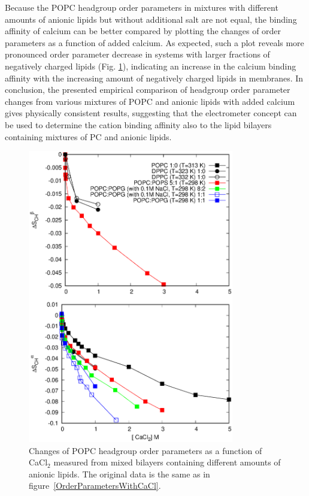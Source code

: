 \documentclass[journal=jpcbfk]{achemso}
\begin{document}
Because the POPC headgroup order parameters in mixtures with different amounts of anionic lipids
but without additional salt are not equal, the binding affinity of calcium can be better compared
by plotting the changes of order parameters as a function of added calcium.
As expected, such a plot reveals more pronounced order parameter decrease in systems
with larger fractions of negatively charged lipids (Fig. \ref{OrderParameterCHANGESWithCaClBELOW1M}),
indicating an increase in the calcium binding affinity with the increasing amount of negatively charged
lipids in membranes. In conclusion, the presented empirical comparison of headgroup order parameter changes
from various mixtures of POPC and anionic lipids with added calcium gives physically
consistent results, suggesting that the electrometer concept can be used to determine
the cation binding affinity also to the lipid bilayers containing mixtures of PC and anionic lipids.  
\begin{figure}[]
  \centering
  \includegraphics[width=9.0cm]{../Figs/CHANGESwithCaCl.eps}
  \caption{\label{OrderParameterCHANGESWithCaClBELOW1M}
    Changes of POPC headgroup order parameters as a function of CaCl$_2$
    measured from mixed bilayers containing different amounts of anionic lipids.
    The original data is the same as in figure~\ref{OrderParametersWithCaCl}.
  }
\end{figure}
\end{document}
